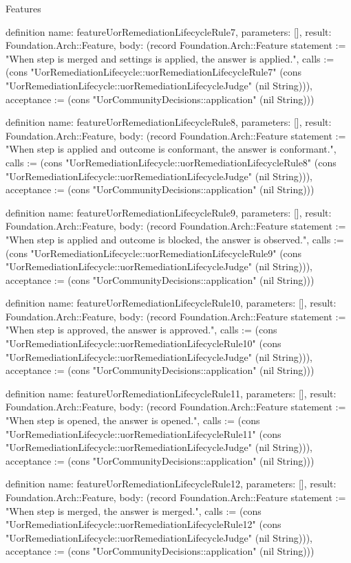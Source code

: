 \begin{lexlean}{Features}
\begin{semanticmodule}
definition{
  name: featureUorRemediationLifecycleRule7,
  parameters: [],
  result: Foundation.Arch::Feature,
  body: (record Foundation.Arch::Feature {statement := "When step is merged and settings is applied, the answer is applied.", calls := (cons "UorRemediationLifecycle::uorRemediationLifecycleRule7" (cons "UorRemediationLifecycle::uorRemediationLifecycleJudge" (nil String))), acceptance := (cons "UorCommunityDecisions::application" (nil String))})
}

definition{
  name: featureUorRemediationLifecycleRule8,
  parameters: [],
  result: Foundation.Arch::Feature,
  body: (record Foundation.Arch::Feature {statement := "When step is applied and outcome is conformant, the answer is conformant.", calls := (cons "UorRemediationLifecycle::uorRemediationLifecycleRule8" (cons "UorRemediationLifecycle::uorRemediationLifecycleJudge" (nil String))), acceptance := (cons "UorCommunityDecisions::application" (nil String))})
}

definition{
  name: featureUorRemediationLifecycleRule9,
  parameters: [],
  result: Foundation.Arch::Feature,
  body: (record Foundation.Arch::Feature {statement := "When step is applied and outcome is blocked, the answer is observed.", calls := (cons "UorRemediationLifecycle::uorRemediationLifecycleRule9" (cons "UorRemediationLifecycle::uorRemediationLifecycleJudge" (nil String))), acceptance := (cons "UorCommunityDecisions::application" (nil String))})
}

definition{
  name: featureUorRemediationLifecycleRule10,
  parameters: [],
  result: Foundation.Arch::Feature,
  body: (record Foundation.Arch::Feature {statement := "When step is approved, the answer is approved.", calls := (cons "UorRemediationLifecycle::uorRemediationLifecycleRule10" (cons "UorRemediationLifecycle::uorRemediationLifecycleJudge" (nil String))), acceptance := (cons "UorCommunityDecisions::application" (nil String))})
}

definition{
  name: featureUorRemediationLifecycleRule11,
  parameters: [],
  result: Foundation.Arch::Feature,
  body: (record Foundation.Arch::Feature {statement := "When step is opened, the answer is opened.", calls := (cons "UorRemediationLifecycle::uorRemediationLifecycleRule11" (cons "UorRemediationLifecycle::uorRemediationLifecycleJudge" (nil String))), acceptance := (cons "UorCommunityDecisions::application" (nil String))})
}

definition{
  name: featureUorRemediationLifecycleRule12,
  parameters: [],
  result: Foundation.Arch::Feature,
  body: (record Foundation.Arch::Feature {statement := "When step is merged, the answer is merged.", calls := (cons "UorRemediationLifecycle::uorRemediationLifecycleRule12" (cons "UorRemediationLifecycle::uorRemediationLifecycleJudge" (nil String))), acceptance := (cons "UorCommunityDecisions::application" (nil String))})
}


\end{semanticmodule}
\end{lexlean}
